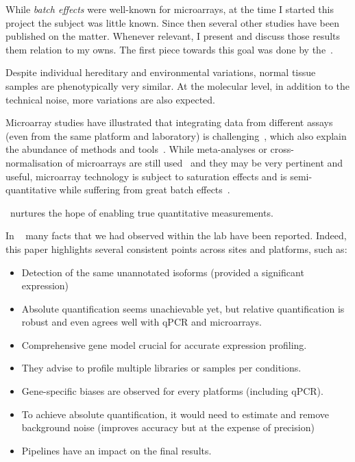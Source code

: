 While \emph{batch effects} were well-known for microarrays,
at the time I started this project
the subject was little known.
Since then several other studies have been published on the matter.
Whenever relevant, I present and discuss those results them relation to my owns.
The first piece towards this goal was done by the~.

\begin{comment}
Normal tissues sampled from various people are phenotypically very similar,
despite individual hereditary and environmental variations.
At molecular level,
technical noise, batch effects and physical limitations
are also generating variations.
\end{comment}


Despite individual hereditary and environmental variations,
normal tissue samples are phenotypically very similar.
At the molecular level, in addition to the technical noise,
more variations are also expected.

Microarray studies have illustrated that integrating data
from different assays (even from the same platform and laboratory)
is challenging~,
which also explain the abundance of methods and tools~.
While meta-analyses or cross-normalisation of microarrays are still
used~ and they may be very pertinent and
useful,
microarray technology is subject to saturation effects and is semi-quantitative
while suffering from great batch effects~.

\Rnaseq\ nurtures the hope of enabling true quantitative measurements.


In ~ many facts that
we had observed within the lab have been reported.
Indeed, this paper highlights several consistent points
across sites and platforms,
such as:
\begin{itemize}[topsep=0pt,nolistsep,noitemsep]
        \setlength{\itemsep}{1pt}
        \setlength{\parskip}{0pt}
        \setlength{\parsep}{0pt}
    \item Detection of the same unannotated isoforms (provided a significant expression)
    \item Absolute quantification seems unachievable yet,
        but relative quantification is robust and even agrees well with \gls{qPCR}
        and microarrays.
    \item Comprehensive gene model crucial for accurate expression profiling.
    \item They advise to profile multiple libraries or samples per conditions.
    \item Gene-specific biases are observed for every platforms
        (including \gls{qPCR}).
    \item To achieve absolute quantification, it would need to estimate and
        remove background noise (improves accuracy but at the expense of precision)
    \item Pipelines have an impact on the final results.
\end{itemize}

